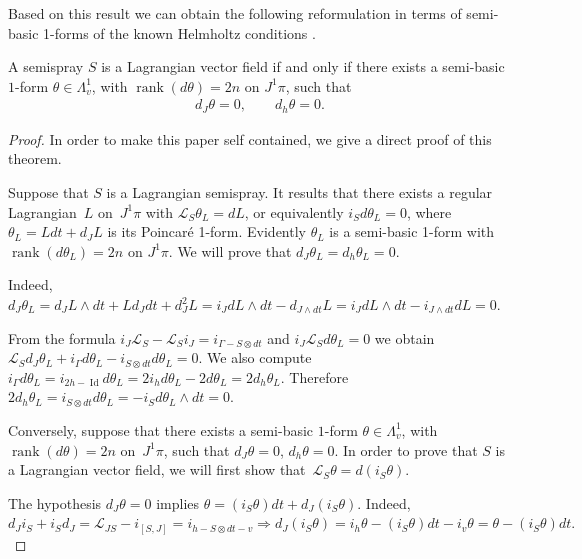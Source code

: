 Based on this result we can obtain the following reformulation in
terms of semi-basic 1-forms of the known Helmholtz conditions \cite[Lemma~4.2, Lemma~4.3,  Theorem~4.5, Theorem~5.1]{B-C-2010}.

\begin{theorem}
A semispray $S$ is a Lagrangian vector field if and only if there
exists a semi-basic $1$-form $\theta\in\Lambda_{v}^{1}$, with $\operatorname{rank}(d\theta)=2n$
on $J^{1}\pi$, such that \begin{gather}
d_{J}\theta=0,\qquad  d_{h}\theta=0.\label{eq:P}
\end{gather}
\end{theorem}
\begin{proof}
In order to make this paper self contained, we give a direct proof
of this theorem.

Suppose that $S$ is a Lagrangian semispray. It results that there
exists a regular Lagrangian~$L$ on~$J^{1}\pi$ with $\mathcal{L}_{S}\theta_{L}=dL$,
or equivalently $i_{S}d\theta_{L}=0$, where $\theta_{L}=Ldt+d_{J}L$
is its Poincar\'e 1-form. Evidently $\theta_{L}$ is a semi-basic 1-form
with $\operatorname{rank}(d\theta_{L})=2n$ on $J^{1}\pi$. We will
prove that $d_{J}\theta_{L}=d_{h}\theta_{L}=0$.

Indeed, $d_{J}\theta_{L}=d_{J}L\wedge dt+Ld_{J}dt+d_{J}^{2}L=i_{J}dL\wedge dt-d_{J\wedge dt}L=i_{J}dL\wedge dt-i_{J\wedge dt}dL=0$.

From the formula $i_{J}\mathcal{L}_{S}-\mathcal{L}_{S}i_{J}=i_{\Gamma-S\otimes dt}$
and $i_{J}\mathcal{L}_{S}d\theta_{L}=0$ we obtain $\mathcal{L}_{S}d_{J}\theta_{L}+i_{\Gamma}d\theta_{L}-i_{S\otimes dt}d\theta_{L}=0$.
We also compute $i_{\Gamma}d\theta_{L}=i_{2h-\operatorname{Id}}d\theta_{L}=2i_{h}d\theta_{L}-2d\theta_{L}=2d_{h}\theta_{L}$.
Therefore $2d_{h}\theta_{L}=i_{S\otimes dt}d\theta_{L}=-i_{S}d\theta_{L}\wedge dt=0$.

Conversely, suppose that there exists a semi-basic $1$-form $\theta\in\Lambda_{v}^{1}$,
with $\operatorname{rank}(d\theta)=2n$ on~$J^{1}\pi$, such that
$d_{J}\theta=0$, $d_{h}\theta=0$. In order to prove that $S$ is
a Lagrangian vector f\/ield, we will f\/irst show that~$\mathcal{L}_{S}\theta=d(i_{S}\theta)$.

The hypothesis $d_{J}\theta=0$ implies $\theta=(i_{S}\theta)dt+d_{J}(i_{S}\theta).$
Indeed, $d_{J}i_{S}+i_{S}d_{J}=\mathcal{L}_{JS}-i_{[S,J]}=i_{h-S\otimes dt-v}\Rightarrow d_{J}(i_{S}\theta)=i_{h}\theta-(i_{S}\theta)dt-i_{v}\theta=\theta-(i_{S}\theta)dt.$


\end{proof}
